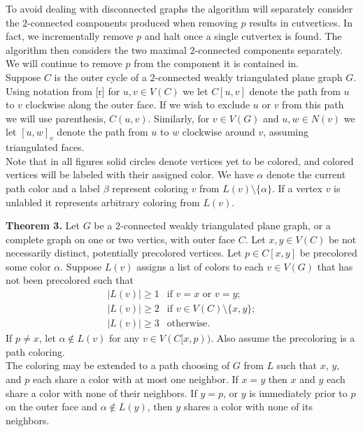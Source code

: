 \documentclass[11pt,letter]{article}
\begin{document}
\noindent To avoid dealing with disconnected graphs the algorithm will separately consider the $2$-connected
components produced when removing
$p$ results in cutvertices. In fact, we incrementally remove $p$ and halt once a single cutvertex is found.
The algorithm then
considers the two maximal $2$-connected components separately. We will continue to remove $p$ from the component
it is contained in.\\

\noindent Suppose $C$ is
the outer cycle of a $2$-connected weakly triangulated plane graph $G$. Using notation from [r] for $u,v\in V(C)$
we let $C[u,v]$ denote the path from $u$ to $v$ clockwise along the outer face. If we wish to exclude $u$ or $v$
from this path we will use parenthesis, $C(u,v)$. Similarly, for $v\in V(G)$ and
$u,w\in N(v)$ we let $[u,w]_v$ denote the path from $u$ to $w$ clockwise around $v$, assuming triangulated
faces.\\

\noindent Note that in all figures solid circles denote vertices yet to be colored, and colored vertices will
be labeled with their assigned color. We have $\alpha$ denote the current path color and a label $\beta$ represent
coloring $v$ from $L(v)\setminus\{\alpha\}$. If a vertex $v$ is unlabled it represents arbitrary coloring from
$L(v)$.\\

\begin{adjustwidth}{1.5em}{1.5em}
\noindent\textbf{Theorem 3.} Let $G$ be a $2$-connected weakly triangulated plane graph, or a complete graph
on one or two vertics, with outer face $C$. 
Let $x,y\in V(C)$ be not necessarily distinct, potentially precolored vertices. Let $p\in C[x,y]$ be precolored some
color $\alpha$. Suppose $L(v)$ assigns a list of colors to each $v\in V(G)$ that has not been precolored such that
\[
    \begin{array}{ll}
	    |L(v)|\ge 1 & \text{if } v=x \text{ or } v=y;\\
	    |L(v)|\ge 2 & \text{if } v\in V(C)\setminus\{x,y\};\\
	    |L(v)|\ge 3 & \text{otherwise.}
    \end{array}
\]
If $p\ne x$, let $\alpha\not\in L(v)$ for
any $v\in V(C[x,p))$. Also assume the precoloring is a path coloring.\\

\noindent The coloring may be extended to
a path choosing of $G$ from $L$ such that $x$, $y$, and $p$ each share a color with at most one neighbor. If
$x=y$ then $x$ and $y$ each share a color with none of their neighbors. If $y=p$, or $y$ is immediately prior to
$p$ on the outer face and $\alpha\not\in L(y)$, then $y$ shares a color with none of its neighbors.\\
\end{adjustwidth}
\end{document}
